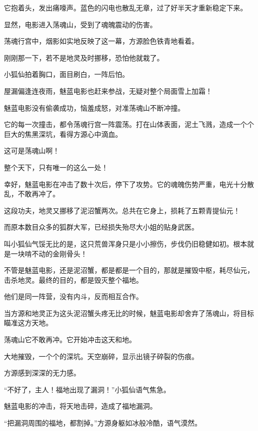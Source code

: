 
\begin{this_body}



它抱着头，发出痛嚎声。蓝色的闪电也散乱无章，过了好半天才重新稳定下来。

显然，电影进入荡魂山，受到了魂魄震动的伤害。

荡魂行宫中，烟影如实地反映了这一幕，方源脸色铁青地看着。

刚刚那一下，若不是地灵及时挪移，恐怕他就栽了。

小狐仙拍着胸口，面目刷白，一阵后怕。

屋漏偏逢连夜雨，魅蓝电影也赶来参战，无疑对整个局面雪上加霜！

魅蓝电影没有偷袭成功，恼羞成怒，对准荡魂山不断冲撞。

它的每一次撞击，都令荡魂行宫一阵震荡。打在山体表面，泥土飞溅，造成一个个巨大的焦黑深坑，看得方源心中滴血。

这可是荡魂山啊！

整个天下，只有唯一的这么一处！

幸好，魅蓝电影在冲击了数十次后，停下了攻势。它的魂魄伤势严重，电光十分散乱，不敢再冲了。

这段功夫，地灵又挪移了泥沼蟹两次。总共在它身上，损耗了五颗青提仙元！

而原本数目众多的狐群大军，已经损失殆尽大小姐的贴身武医。

叫小狐仙气馁无比的是，这只荒兽浑身只是小小擦伤，步伐仍旧稳健如初。根本就是一块啃不动的金刚骨头！

不管是魅蓝电影，还是泥沼蟹，都是都是一个目的，那就是摧毁中枢，耗尽仙元，击杀地灵。最终的目的，都是毁灭整个福地。

他们是同一阵营，没有内斗，反而相互合作。

当方源和地灵正为这头泥沼蟹头疼无比的时候，魅蓝电影却舍弃了荡魂山，将目标瞄准这方天地。

荡魂山它不敢再冲。它开始冲击这天和地。

大地摧毁，一个个的深坑。天空崩碎，显示出镜子碎裂的伤痕。

方源感到深深的无力感。

“不好了，主人！福地出现了漏洞！”小狐仙语气焦急。

魅蓝电影的冲击，将天地击碎，造成了福地漏洞。

“把漏洞周围的福地，都割掉。”方源身躯如冰般冷酷，语气漠然。


\end{this_body}
